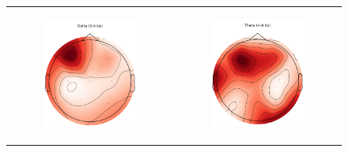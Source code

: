 \begin{figure}[!ht]
    \centering
    \begin{tabular}{cc}
        \begin{subfigure}[c]{0.3\textwidth}
            \centering
            \includegraphics{images/topomap_delta_colored.png}
            \caption{}
        \end{subfigure}
        &
        \begin{subfigure}[c]{0.3\textwidth}
            \centering
            \includegraphics{images/topomap_theta_colored.png}

\end{subfigure}
\end{tabular}
\end{figure}
